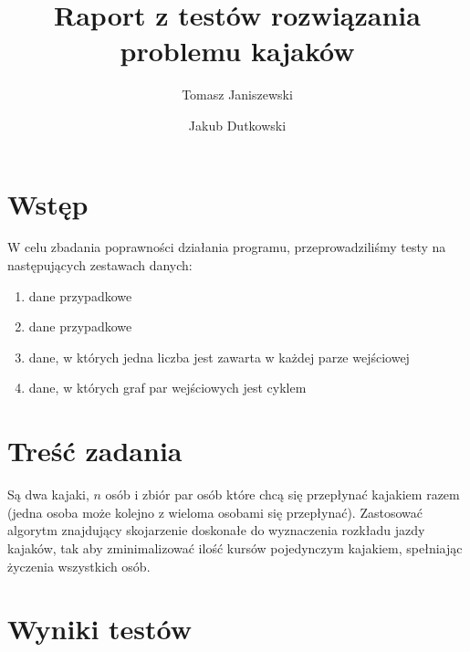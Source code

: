 \documentclass{llncs}
\begin{document}
\title{Raport z testów rozwiązania problemu kajaków}
%
%
\author{Tomasz Janiszewski \and Jakub Dutkowski}
%
%


\maketitle              %

%
\section{Wstęp}
W celu zbadania poprawności działania programu, przeprowadziliśmy testy na następujących zestawach danych:
\begin{enumerate}
\item dane przypadkowe
\item dane przypadkowe
\item dane, w których jedna liczba jest zawarta w każdej parze wejściowej
\item dane, w których graf par wejściowych jest cyklem
\end{enumerate}

\section{Treść zadania}
Są dwa kajaki, $n$ osób i zbiór par osób które chcą się
przepłynać kajakiem razem (jedna osoba może kolejno z wieloma osobami się
przepłynać). Zastosować algorytm znajdujący skojarzenie doskonałe do
wyznaczenia rozkładu jazdy kajaków, tak aby zminimalizować ilość kursów
pojedynczym kajakiem, spełniając życzenia wszystkich osób.

\section{Wyniki testów}
\end{document}
